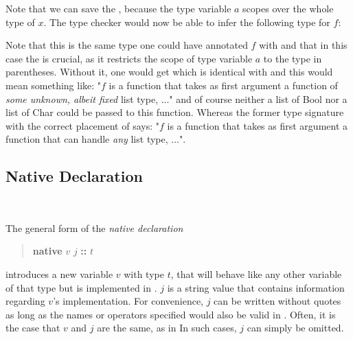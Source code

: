 Note that we can save the , because the type variable $a$ scopes over the whole type of $x$.
The type checker would now be able to infer the following type for $f$:

Note that this is the same type one could have annotated $f$ with and that in this case the  is crucial, as it restricts the scope of type variable $a$ to the type in parentheses. Without it, one would get
which is identical with
and this would mean something like: "$f$ is a function that takes as first argument a function of \emph{some unknown, albeit fixed} list type, ..." and of course neither a list of Bool nor a list of Char could be passed to this function. Whereas the former type signature with the correct placement of  says: "$f$ is a function that takes as first argument a function that can handle \emph{any} list type, ...".


\subsection{Native  Declaration} \label{nativefun}

\begin{flushleft}
     \sym{::} \\
  \oder{}  \oder{}  \oder{} 
\end{flushleft}

The general form of the \emph{native declaration}
\begin{quote}
\textbf{native} $v$  $j$ \textbf{::} $t$
\end{quote}
introduces a new variable $v$ with type $t$, that will behave like any other \frege{} variable of that type but is implemented in \java{}. $j$ is a string value that contains information regarding $v$'s \java{} implementation. For convenience, $j$ can be written without quotes as long as the names or operators specified would also be valid in \frege{}. Often, it is the case that $v$ and $j$ are the same, as in 
In such cases, $j$ can simply be omitted.

